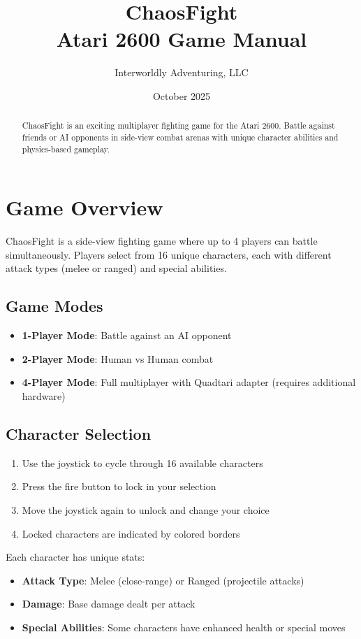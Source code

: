\documentclass[10pt,twocolumn]{article}
\title{ChaosFight\\Atari 2600 Game Manual}
\author{Interworldly Adventuring, LLC}
\date{October 2025}
\begin{document}
\maketitle

\begin{abstract}
ChaosFight is an exciting multiplayer fighting game for the Atari 2600. Battle against friends or AI opponents in side-view combat arenas with unique character abilities and physics-based gameplay.
\end{abstract}

\section{Game Overview}

ChaosFight is a side-view fighting game where up to 4 players can battle simultaneously. Players select from 16 unique characters, each with different attack types (melee or ranged) and special abilities.

\subsection{Game Modes}
\begin{itemize}
\item \textbf{1-Player Mode}: Battle against an AI opponent
\item \textbf{2-Player Mode}: Human vs Human combat
\item \textbf{4-Player Mode}: Full multiplayer with Quadtari adapter (requires additional hardware)
\end{itemize}

\subsection{Character Selection}
\begin{enumerate}
\item Use the joystick to cycle through 16 available characters
\item Press the fire button to lock in your selection
\item Move the joystick again to unlock and change your choice
\item Locked characters are indicated by colored borders
\end{enumerate}

Each character has unique stats:
\begin{itemize}
\item \textbf{Attack Type}: Melee (close-range) or Ranged (projectile attacks)
\item \textbf{Damage}: Base damage dealt per attack
\item \textbf{Special Abilities}: Some characters have enhanced health or special moves
\end{itemize}
\end{document}
